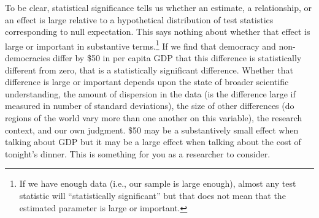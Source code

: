 \documentclass[a4paper,12pt]{article}
\begin{document}
\begin{enumerate}
\noindent To be clear, statistical significance tells us whether an estimate, a relationship, or an effect is large relative to a hypothetical distribution of test statistics corresponding to null expectation. This says nothing about whether that effect is large or important in substantive terms.\footnote{If we have enough data (i.e., our sample is large enough), almost any test statistic will ``statistically significant'' but that does not mean that the estimated parameter is large or important.} If we find that democracy and non-democracies differ by \$50 in per capita GDP that this difference is statistically different from zero, that is a statistically significant difference. Whether that difference is large or important depends upon the state of broader scientific understanding, the amount of dispersion in the data (is the difference large if measured in number of standard deviations), the size of other differences (do regions of the world vary more than one another on this variable), the research context, and our own judgment. \$50 may be a substantively small effect when talking about GDP but it may be a large effect when talking about the cost of tonight's dinner. This is something for you as a researcher to consider.

\end{enumerate}
\end{document}
